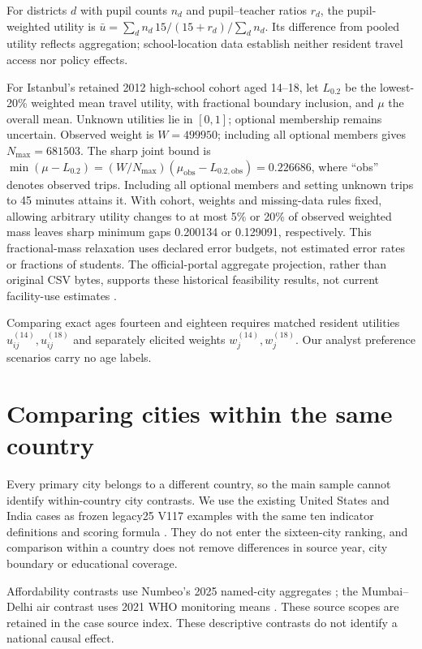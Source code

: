 \EquityCase
For districts $d$ with pupil counts $n_d$ and pupil--teacher ratios $r_d$,
the pupil-weighted utility is
$\bar u=\sum_d n_d\,15/(15+r_d)/\sum_dn_d$.
Its difference from pooled utility reflects aggregation; school-location data
establish neither resident travel access nor policy effects.

For Istanbul's retained 2012 high-school cohort aged 14--18, let $L_{0.2}$
be the lowest-20\% weighted mean travel utility, with fractional boundary
inclusion, and $\mu$ the overall mean. Unknown utilities lie in $[0,1]$; optional membership remains uncertain. Observed weight is $W=499950$; including all
optional members gives $N_{\max}=681503$. The sharp joint bound is
$\min(\mu-L_{0.2})=(W/N_{\max})(\mu_{\mathrm{obs}}-L_{0.2,\mathrm{obs}})=0.226686$,
where ``obs'' denotes observed trips.
Including all optional members and setting unknown trips to 45 minutes attains it.
With cohort, weights and missing-data rules fixed, allowing arbitrary utility
changes to at most 5\% or 20\% of observed weighted mass leaves sharp minimum gaps
0.200134 or 0.129091, respectively. This fractional-mass relaxation uses declared
error budgets, not estimated error rates or fractions of students.
The official-portal aggregate projection, rather than original CSV bytes,
supports these historical feasibility results, not current facility-use estimates
\cite{istanbul}.

\AgeCase



Comparing exact ages fourteen and eighteen requires matched resident utilities
$u_{ij}^{(14)},u_{ij}^{(18)}$ and separately elicited weights
$w_j^{(14)},w_j^{(18)}$. Our analyst preference scenarios carry no age labels.

\section{Comparing cities within the same country}
Every primary city belongs to a different country, so the main sample cannot
identify within-country city contrasts. We use the existing United States and
India cases as frozen legacy25 V117 examples with the same ten indicator
definitions and scoring formula \cite{legacycase}. They do not enter the sixteen-city ranking,
and comparison within a country does not remove differences in source year,
city boundary or educational coverage.



\CountryInterpretation
Affordability contrasts use Numbeo's 2025 named-city aggregates
\cite{numbeocase}; the Mumbai--Delhi air contrast uses 2021 WHO monitoring
means \cite{whocase}. These source scopes are retained in the case source index.
These descriptive contrasts do not identify a national causal effect.

\FloatBarrier
